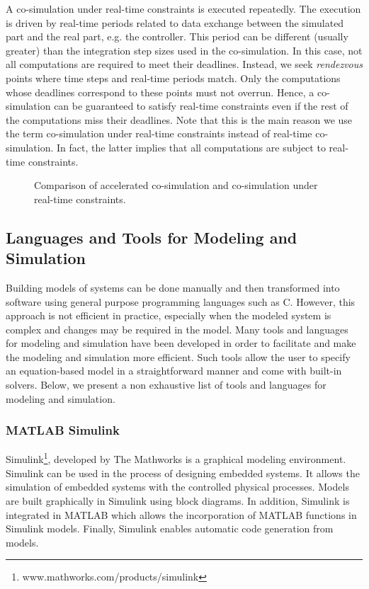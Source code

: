 A co-simulation under real-time constraints is executed repeatedly. The execution is driven by real-time periods related to data exchange between the simulated part and the real part, e.g. the controller. This period can be different (usually greater) than the integration step sizes used in the co-simulation. In this case, not all computations are required to meet their deadlines. Instead, we seek \textit{rendezvous} points where time steps and real-time periods match. Only the computations whose deadlines correspond to these points must not overrun. Hence, a co-simulation can be guaranteed to satisfy real-time constraints even if the rest of the computations miss their deadlines. Note that this is the main reason we use the term co-simulation under real-time constraints instead of real-time co-simulation. In fact, the latter implies that all computations are subject to real-time constraints.   

\begin{figure}[phbt]
\centering
\captionsetup{justification=centering}

\caption{Comparison of accelerated co-simulation and co-simulation under real-time constraints.}
\label{fig:rtcosim}
\end{figure} 

\subsection{\label{lngtoolsMS}Languages and Tools for Modeling and Simulation}

Building models of systems can be done manually and then transformed into software using general purpose programming languages such as C. However, this approach is not efficient in practice, especially when the modeled system is complex and changes may be required in the model. Many tools and languages for modeling and simulation have been developed in order to facilitate and make the modeling and simulation more efficient. Such tools allow the user to specify an equation-based model in a straightforward manner and come with built-in solvers. Below, we present a non exhaustive list of tools and languages for modeling and simulation.


\subsubsection{MATLAB Simulink}
Simulink\footnote{www.mathworks.com/products/simulink}, developed by The Mathworks is a graphical modeling environment. Simulink can be used in the  process of designing embedded systems. It allows the simulation of embedded systems with the controlled physical processes. Models are built graphically in Simulink using block diagrams. In addition, Simulink is integrated in MATLAB which allows the incorporation of MATLAB functions in Simulink models. Finally, Simulink enables automatic code generation from models.

